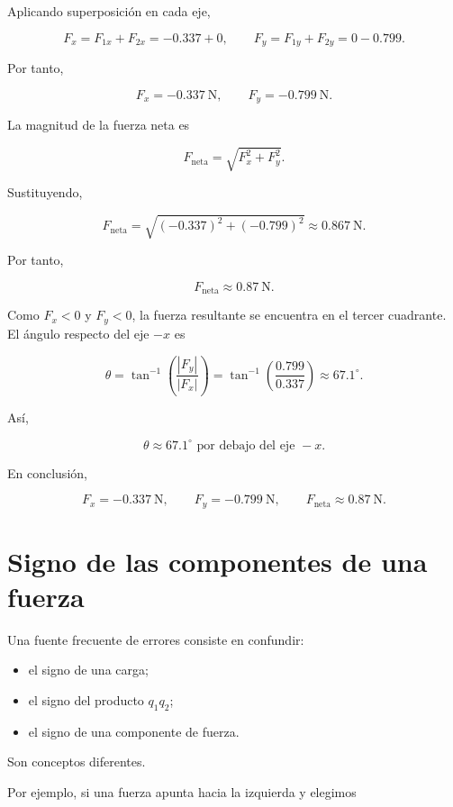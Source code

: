 Aplicando superposición en cada eje,

\[
F_x=F_{1x}+F_{2x}=-0.337+0,
\qquad
F_y=F_{1y}+F_{2y}=0-0.799.
\]

Por tanto,

\[
\boxed{F_x=-\SI{0.337}{\newton}},
\qquad
\boxed{F_y=-\SI{0.799}{\newton}}.
\]

La magnitud de la fuerza neta es

\[
F_{\text{neta}}=\sqrt{F_x^2+F_y^2}.
\]

Sustituyendo,

\[
F_{\text{neta}}
=\sqrt{(-0.337)^2+(-0.799)^2}
\approx\SI{0.867}{\newton}.
\]

Por tanto,

\[
\boxed{F_{\text{neta}}\approx\SI{0.87}{\newton}}.
\]

Como \(F_x<0\) y \(F_y<0\), la fuerza resultante se encuentra en el tercer
cuadrante. El ángulo respecto del eje \(-x\) es

\[
\theta=\tan^{-1}\left(\frac{|F_y|}{|F_x|}\right)
=\tan^{-1}\left(\frac{0.799}{0.337}\right)
\approx67.1^\circ.
\]

Así,

\[
\boxed{\theta\approx67.1^\circ\text{ por debajo del eje }-x}.
\]

En conclusión,

\[
\boxed{
F_x=-\SI{0.337}{\newton},\qquad
F_y=-\SI{0.799}{\newton},\qquad
F_{\text{neta}}\approx\SI{0.87}{\newton}
}.
\]



\section{Signo de las componentes de una fuerza}

Una fuente frecuente de errores consiste en confundir:

\begin{itemize}
    \item el signo de una carga;
    \item el signo del producto \(q_1q_2\);
    \item el signo de una componente de fuerza.
\end{itemize}

Son conceptos diferentes.

Por ejemplo, si una fuerza apunta hacia la izquierda y elegimos

